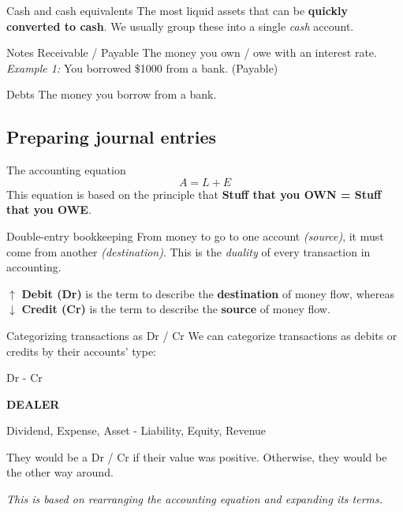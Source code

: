 \begin{knBox}
    {Cash and cash equivalents}
    The most liquid assets that can be \textbf{quickly converted to cash}. We usually group these into a single \textit{cash} account.
\end{knBox}

\begin{knBox}
    {Notes Receivable / Payable}
    The money you own / owe with an interest rate.
    \tcblower
    \textit{Example 1: } You borrowed \$1000 from a bank. (Payable)
\end{knBox}
\label{def:nrp}

\begin{knBox}
    {Debts}
    The money you borrow from a bank.
\end{knBox}

\subsection{Preparing journal entries}
\label{subsec:prepare}
\begin{definition}
    {The accounting equation}
    \[A = L + E\]
    This equation is based on the principle that \textbf{Stuff that you OWN = Stuff that you OWE}.
    \label{def:account_equation}
\end{definition}

\begin{theorem}
    {Double-entry bookkeeping}
    From money to go to one account \textit{(source)}, it must come from another \textit{(destination)}. This is the \textit{duality} of every transaction in accounting.

    $\uparrow$ \textbf{Debit (Dr)} is the term to describe the \textbf{destination} of money flow, whereas $\downarrow$ \textbf{Credit (Cr)} is the term to describe the \textbf{source} of money flow.
\end{theorem}
\label{thm:debit_credit}

\begin{knBox}
    {Categorizing transactions as Dr / Cr}
    We can categorize transactions as debits or credits by their accounts' type:
    \vspace{0.5em}
    \begin{center}
        \small
        Dr - Cr
        \normalsize

        \textbf{DEALER}

        Dividend, Expense, Asset - Liability, Equity, Revenue
    \end{center}
    They would be a Dr / Cr if their value was positive. Otherwise, they would be the other way around.

    \textit{This is based on rearranging the accounting equation and expanding its terms.}
\end{knBox}

